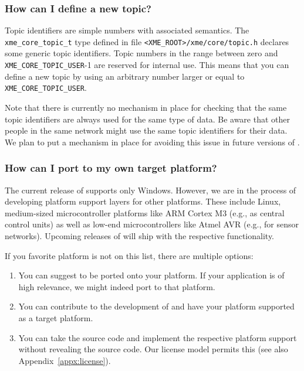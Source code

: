 \subsubsection{How can I define a new topic?}

Topic identifiers are simple numbers with associated semantics.
The \verb|xme_core_topic_t| type defined in file \verb|<XME_ROOT>/xme/core/topic.h| declares some generic topic identifiers.
Topic numbers in the range between zero and \verb|XME_CORE_TOPIC_USER|-1 are reserved for internal use.
This means that you can define a new topic by using an arbitrary number larger or equal to \verb|XME_CORE_TOPIC_USER|.

Note that there is currently no mechanism in place for checking that the same topic identifiers are always used for the same type of data.
Be aware that other people in the same network might use the same topic identifiers for their data.
We plan to put a mechanism in place for avoiding this issue in future versions of \xme.

\subsubsection{How can I port \xme to my own target platform?}

The current release of \xme supports only Windows.
However, we are in the process of developing platform support layers for other platforms.
These include Linux, medium-sized microcontroller platforms like ARM Cortex M3 (e.g., as central control units)
as well as low-end microcontrollers like Atmel AVR (e.g., for sensor networks).
Upcoming releases of \xme will ship with the respective functionality.

If you favorite platform is not on this list, there are multiple options:
\begin{enumerate}
	\item You can suggest \xme to be ported onto your platform.
		If your application is of high relevance, we might indeed port \xme to that platform.
	
	\item You can contribute to the development of \xme and have your platform supported as a target platform.
	
	\item You can take the \xme source code and implement the respective platform support without revealing the source code.
		Our license model permits this (see also Appendix~\ref{appx:license}).
\end{enumerate}

